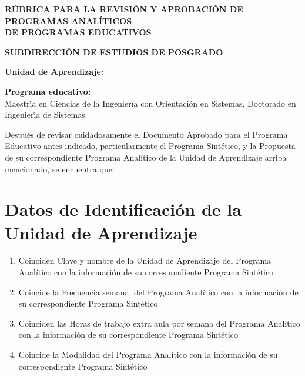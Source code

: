 \documentclass{article}
\newcounter{boxcount}
\newcommand{\sino}{\hfill \CheckBox[name=yesbox\refstepcounter{boxcount},checkboxsymbol=\ding{56}]{S\'{i}}%
  \quad%
  \CheckBox[name=nobox\refstepcounter{boxcount},checkboxsymbol=\ding{56}]{No}}
\newcommand{\rsino}{\begin{flushright}\sino\end{flushright}}
\begin{document}
\pagestyle{fancy}

\begin{center}
  {\bf R\'{U}BRICA PARA LA REVISI\'{O}N Y APROBACI\'{O}N DE PROGRAMAS ANAL\'{I}TICOS \\ DE PROGRAMAS EDUCATIVOS}

  {\bf SUBDIRECCI\'{O}N DE ESTUDIOS DE POSGRADO}
\end{center}

\begin{Form}

  {\bf Unidad de Aprendizaje:} \\

  \TextField[name=ua,multiline=false,bordercolor=black,align=0,width=\textwidth,height=7mm,default={Clave y nombre}]{}

{\bf Programa educativo:} \\
  
\ChoiceMenu[print,combo,default=Seleccione,name=pr]{}%
           {Maestr\'{\i}a en Ciencias de la Ingenier\'{\i}a con Orientaci\'{o}n en Sistemas, %
             Doctorado en Ingenier\'{\i}a de Sistemas}

Despu\'{e}s de revisar cuidadosamente el Documento Aprobado para el
Programa Educativo antes indicado, particularmente el Programa
Sint\'{e}tico, y la Propuesta de su correspondiente Programa Anal\'{i}tico de
la Unidad de Aprendizaje arriba mencionado, se encuentra que:

\section{Datos de Identificaci\'{o}n de la Unidad de Aprendizaje}

\begin{enumerate}[leftmargin=*,nolistsep]

\item{Coinciden Clave y nombre de la Unidad de Aprendizaje del
  Programa Anal\'{i}tico con la informaci\'{o}n de su correspondiente
  Programa Sint\'{e}tico \sino}

\item{Coincide la Frecuencia semanal del Programa Anal\'{i}tico con la
  informaci\'{o}n de su correspondiente Programa Sint\'{e}tico \rsino}

\item{Coinciden las Horas de trabajo extra aula por semana del
  Programa Anal\'{i}tico con la informaci\'{o}n de su correspondiente
  Programa Sint\'{e}tico \sino}

\item{Coincide la Modalidad del Programa Anal\'{i}tico con la
  informaci\'{o}n de su correspondiente Programa Sint\'{e}tico \sino}


\end{enumerate}
\end{Form}
\end{document}
